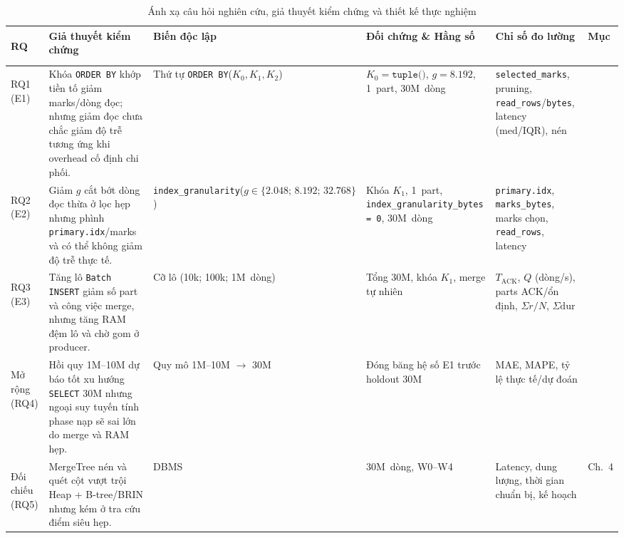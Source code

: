 \documentclass[13pt,a4paper]{report}
\begin{document}
\begin{table}[!htb]
\centering
\scriptsize
\setlength{\tabcolsep}{4pt}
\renewcommand{\arraystretch}{1.08}
\caption{Ánh xạ câu hỏi nghiên cứu, giả thuyết kiểm chứng và thiết kế thực nghiệm}
\label{tab:rq_mapping}
\begin{tabularx}{\textwidth}{>{\bfseries\raggedright\arraybackslash}p{1.35cm} >{\raggedright\arraybackslash}p{3.85cm} >{\raggedright\arraybackslash}p{2.55cm} >{\raggedright\arraybackslash}p{2.55cm} >{\raggedright\arraybackslash}X >{\centering\arraybackslash}p{1.1cm}}
\toprule
\textbf{RQ} & \textbf{Giả thuyết kiểm chứng} & \textbf{Biến độc lập} & \textbf{Đối chứng \& Hằng số} & \textbf{Chỉ số đo lường} & \textbf{Mục} \\
\midrule
RQ1 (E1) & Khóa \texttt{ORDER BY} khớp tiền tố giảm marks/dòng đọc; nhưng giảm đọc chưa chắc giảm độ trễ tương ứng khi overhead cố định chi phối. & Thứ tự \texttt{ORDER BY}\newline ($K_0, K_1, K_2$) & $K_0 = \texttt{tuple()}$, $g = 8.192$, 1~part, 30M~dòng & \texttt{selected\_\allowbreak{}marks}, pruning, \texttt{read\_\allowbreak{}rows}/\texttt{bytes}, latency (med/IQR), nén & 3.3 \\
\addlinespace[3pt]
RQ2 (E2) & Giảm $g$ cắt bớt dòng đọc thừa ở lọc hẹp nhưng phình \texttt{primary.idx}/marks và có thể không giảm độ trễ thực tế. & \texttt{index\_\allowbreak{}granularity}\newline ($g \in \{2.048;\, 8.192;\, 32.768\}$) & Khóa $K_1$, 1~part, \texttt{index\_\allowbreak{}granularity\_\allowbreak{}bytes = 0}, 30M~dòng & \texttt{primary.idx}, \texttt{marks\_\allowbreak{}bytes}, marks chọn, \texttt{read\_\allowbreak{}rows}, latency & 3.4 \\
\addlinespace[3pt]
RQ3 (E3) & Tăng lô \texttt{Batch INSERT} giảm số part và công việc merge, nhưng tăng RAM đệm lô và chờ gom ở producer. & Cỡ lô (10k; 100k; 1M~dòng) & Tổng 30M, khóa $K_1$, merge tự nhiên & $T_{\text{ACK}}$, $Q$ (dòng/s), parts ACK/ổn định, $\Sigma r / N$, $\Sigma\text{dur}$ & 3.5 \\
\addlinespace[3pt]
Mở rộng (RQ4) & Hồi quy 1M--10M dự báo tốt xu hướng \texttt{SELECT} 30M nhưng ngoại suy tuyến tính phase nạp sẽ sai lớn do merge và RAM hẹp. & Quy mô 1M--10M $\rightarrow$ 30M & Đóng băng hệ số E1 trước holdout 30M & MAE, MAPE, tỷ lệ thực tế/dự đoán & 3.6 \\
\addlinespace[3pt]
Đối chiếu (RQ5) & MergeTree nén và quét cột vượt trội Heap + B-tree/BRIN nhưng kém ở tra cứu điểm siêu hẹp. & DBMS & 30M~dòng, W0--W4 & Latency, dung lượng, thời gian chuẩn bị, kế hoạch & Ch.~4 \\
\bottomrule
\end{tabularx}
\end{table}
\end{document}
